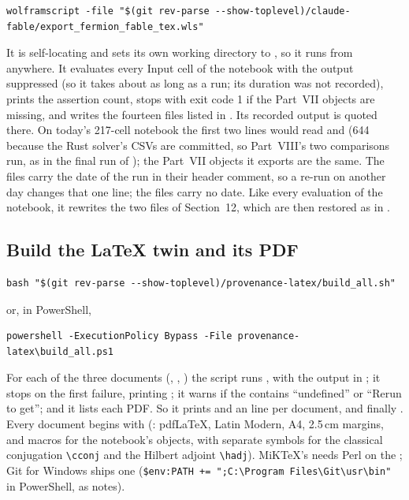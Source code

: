 \begin{Verbatim}
wolframscript -file "$(git rev-parse --show-toplevel)/claude-fable/export_fermion_fable_tex.wls"
\end{Verbatim}

It is self-locating and sets its own working directory to , so it runs from
anywhere. It evaluates every Input cell of the notebook with the output suppressed (so it takes about
as long as a run; its duration was not recorded), prints the assertion count, stops with exit code 1
if the Part~VII objects are missing, and writes the fourteen files listed in . Its
recorded output is quoted there. On today's 217-cell notebook the first two lines would read
 and  (644 because the Rust solver's
CSVs are committed, so Part~VIII's two comparisons run, as in the final run of ); the
Part~VII objects it exports are the same. The  files carry the date of the run in their header comment, so a
re-run on another day changes that one line; the  files carry no date. Like every
evaluation of the notebook, it rewrites the two  files of Section~12, which are then
restored as in .

\subsection{Build the LaTeX twin and its PDF}
\label{sec:11.6}

\begin{Verbatim}
bash "$(git rev-parse --show-toplevel)/provenance-latex/build_all.sh"
\end{Verbatim}

or, in PowerShell,

\begin{Verbatim}
powershell -ExecutionPolicy Bypass -File provenance-latex\build_all.ps1
\end{Verbatim}

For each of the three documents (,
, ) the script runs
, with the output in
; it stops on the first failure, printing
; it warns if the 
contains ``undefined'' or ``Rerun to get''; and it lists each PDF. So it prints  and
an  line per document, and finally . Every document
begins with \verb|| (: pdfLaTeX, Latin Modern,
A4, 2.5\,cm margins, and macros for the notebook's objects, with separate symbols for the classical
conjugation \verb|\cconj| and the Hilbert adjoint \verb|\hadj|). MiKTeX's  needs
Perl on the ; Git for Windows ships one (\verb|$env:PATH += ";C:\Program Files\Git\usr\bin"|
in PowerShell, as  notes).

